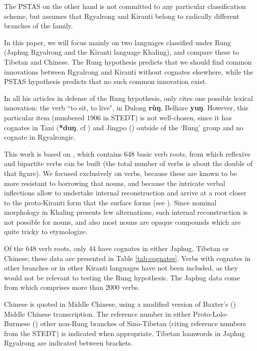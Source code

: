\documentclass[oldfontcommands,oneside,a4paper,11pt]{article}
\newcommand{\ipa}[1]{{\phon\textbf{#1}}}
\begin{document}
The PSTAS on the other hand is not committed to any particular classification scheme, but assumes that Rgyalrong and Kiranti belong to radically different branches of the family.

In this paper, we will focus mainly on two languages classified under Rung (Japhug Rgyalrong and the Kiranti language Khaling), and compare these to Tibetan and Chinese. The Rung hypothesis predicts that we should find common innovations between Rgyalrong and Kiranti without cognates elsewhere, while the PSTAS hypothesis predicts that no such common innovation exist.

In all his articles in defense of the Rung hypothesis, \citet{lapolla13subgrouping} only cites one possible lexical innovation: the verb ``to sit, to live", in Dulong \ipa{rùŋ}, Belhare \ipa{yuŋ}. However, this particular item (numbered 1906 in STEDT) is not well-chosen, since it has cognates in Tani (\ipa{*duŋ}, cf \citealt{jackson93}) and Jingpo () outside of the `Rung' group and no cognate in Rgyalrongic.

This work is based on \citet{jacques15khaling}, which contains 648 basic verb roots, from which reflexive and bipartite verbs can be built (the total number of verbs is about the double of that figure). We focused exclusively on verbs, because these are known to be more resistant to borrowing that nouns, and because the intricate verbal inflections allow to undertake internal reconstruction and arrive at a root closer to the proto-Kiranti form that the surface forms (see \citealt{jacques12khaling}). Since nominal morphology in Khaling presents few alternations, such internal reconstruction is not possible for nouns, and also most nouns are opaque compounds which are quite tricky to etymologize.

Of the 648 verb roots, only 44 have cognates in either Japhug, Tibetan or Chinese; these data are presented in Table \ref{tab:cognates}. Verbs with cognates in other branches or in other Kiranti languages have not been included, as they would not be relevant to testing the Rung hypothesis. The Japhug data come from \citet{jacques16japhug} which comprises more than 2000 verbs.

Chinese is quoted in Middle Chinese, using a modified version of Baxter's (\citeyear{baxter92}) Middle Chinese transcription. 
The reference number in either Proto-Lolo-Burmese (\citealt{bradley79}) other non-Rung branches of Sino-Tibetan (citing reference numbers from the STEDT) is indicated when appropriate. Tibetan loanwords in Japhug Rgyalrong are indicated between brackets.
\end{document}
